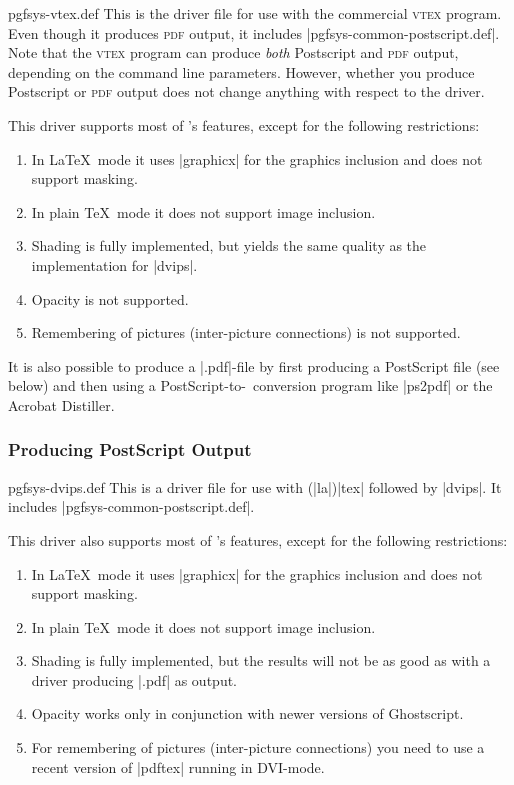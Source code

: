 \begin{filedescription}{pgfsys-vtex.def}
  This is the driver file for use with the commercial \textsc{vtex}
  program. Even though it produces  \textsc{pdf} output, it
  includes |pgfsys-common-postscript.def|. Note that the
  \textsc{vtex} program can produce \emph{both} Postscript and
  \textsc{pdf} output, depending on the command line
  parameters. However, whether you produce Postscript or
  \textsc{pdf} output does not change anything with respect to the
  driver.

  This driver supports most of \pgfname's features, except for
  the following restrictions:
  \begin{enumerate}
  \item
    In \LaTeX\ mode it uses |graphicx| for the graphics
    inclusion and does not support masking.
  \item
    In plain \TeX\ mode it does not support image inclusion.
  \item
    Shading is fully implemented, but yields the same quality as the
    implementation for |dvips|.
  \item
    Opacity is not supported.
  \item
    Remembering of pictures (inter-picture connections) is not
    supported.
  \end{enumerate}
\end{filedescription}

It is also possible to produce a |.pdf|-file by first producing a
PostScript file (see below) and then using a PostScript-to-\pdf\
conversion program like |ps2pdf| or the Acrobat Distiller.


\subsubsection{Producing PostScript Output}

\begin{filedescription}{pgfsys-dvips.def}
  This is a driver file for use with (|la|)|tex| followed by
  |dvips|. It includes |pgfsys-common-postscript.def|.

  This driver also supports most of \pgfname's features, except for
  the following restrictions:
  \begin{enumerate}
  \item
    In \LaTeX\ mode it uses |graphicx| for the graphics
    inclusion and does not support masking.
  \item
    In plain \TeX\ mode it does not support image inclusion.
  \item
    Shading is fully implemented, but the results will not be
    as good as with a driver producing |.pdf| as output.
  \item
    Opacity works only in conjunction with newer versions of
    Ghostscript.
  \item
    For remembering of pictures (inter-picture connections) you need
    to use a recent version of |pdftex| running in DVI-mode.
  \end{enumerate}
\end{filedescription}

